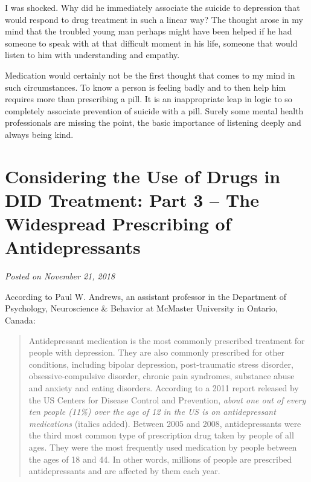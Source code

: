 \documentclass[]{book}
\begin{document}
I was shocked. Why did he immediately associate the suicide to depression that would respond to drug treatment in such a linear way? The thought arose in my mind that the troubled young man perhaps might have been helped if he had someone to speak with at that difficult moment in his life, someone that would listen to him with understanding and empathy.

Medication would certainly not be the first thought that comes to my mind in such circumstances. To know a person is feeling badly and to then help him requires more than prescribing a pill. It is an inappropriate leap in logic to so completely associate prevention of suicide with a pill. Surely some mental health professionals are missing the point, the basic importance of listening deeply and always being kind.

\hypertarget{considering-the-use-of-drugs-in-did-treatment-part-3-the-widespread-prescribing-of-antidepressants}{%
\section{Considering the Use of Drugs in DID Treatment: Part 3 -- The Widespread Prescribing of Antidepressants}\label{considering-the-use-of-drugs-in-did-treatment-part-3-the-widespread-prescribing-of-antidepressants}}

\emph{Posted on November 21, 2018}

According to Paul W. Andrews, an assistant professor in the Department of Psychology, Neuroscience \& Behavior at McMaster University in Ontario, Canada:

\begin{quote}
Antidepressant medication is the most commonly prescribed treatment for people with depression. They are also commonly prescribed for other conditions, including bipolar depression, post-traumatic stress disorder, obsessive-compulsive disorder, chronic pain syndromes, substance abuse and anxiety and eating disorders. According to a 2011 report released by the US Centers for Disease Control and Prevention, \emph{about one out of every ten people (11\%) over the age of 12 in the US is on antidepressant medications} (italics added). Between 2005 and 2008, antidepressants were the third most common type of prescription drug taken by people of all ages. They were the most frequently used medication by people between the ages of 18 and 44. In other words, millions of people are prescribed antidepressants and are affected by them each year.
\end{quote}
\end{document}
